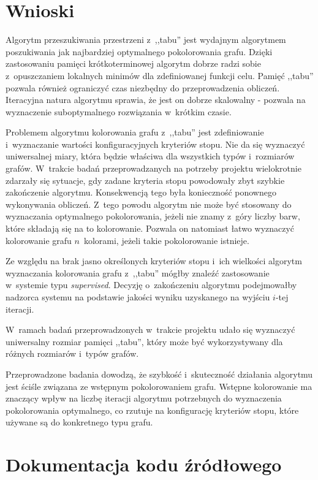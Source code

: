 \documentclass[a4paper,10pt]{article}
\begin{document}
\section*{Wnioski}

Algorytm przeszukiwania przestrzeni z~,,tabu'' jest wydajnym algorytmem poszukiwania jak najbardziej optymalnego pokolorowania grafu. Dzięki zastosowaniu pamięci krótkoterminowej algorytm dobrze radzi sobie z~opuszczaniem lokalnych minimów dla zdefiniowanej funkcji celu. Pamięć ,,tabu'' pozwala również ograniczyć czas niezbędny do przeprowadzenia obliczeń. Iteracyjna natura algorytmu sprawia, że jest on dobrze skalowalny - pozwala na wyznaczenie suboptymalnego rozwiązania w~krótkim czasie.

Problemem algorytmu kolorowania grafu z~,,tabu'' jest zdefiniowanie i~wyznaczanie wartości konfiguracyjnych kryteriów stopu. Nie da się wyznaczyć uniwersalnej miary, która będzie właściwa dla wszystkich typów i~rozmiarów grafów. W~trakcie badań przeprowadzanych na potrzeby projektu wielokrotnie zdarzały się sytuacje, gdy zadane kryteria stopu powodowały zbyt szybkie zakończenie algorytmu. Konsekwencją tego była konieczność ponownego wykonywania obliczeń. Z~tego powodu algorytm nie może być stosowany do wyznaczania optymalnego pokolorowania, jeżeli nie znamy z~góry liczby barw, które składają się na to kolorowanie. Pozwala on natomiast łatwo wyznaczyć kolorowanie grafu $n$~kolorami, jeżeli takie pokolorowanie istnieje.

Ze względu na brak jasno określonych kryteriów stopu i~ich wielkości algorytm wyznaczania kolorowania grafu z~,,tabu'' mógłby znaleźć zastosowanie w~systemie typu \emph{supervised}. Decyzję o~zakończeniu algorytmu podejmowałby nadzorca systemu na podstawie jakości wyniku uzyskanego na wyjściu $i$-tej iteracji.

W~ramach badań przeprowadzonych w~trakcie projektu udało się wyznaczyć uniwersalny rozmiar pamięci ,,tabu'', który może być wykorzystywany dla różnych rozmiarów i~typów grafów.

Przeprowadzone badania dowodzą, że szybkość i~skuteczność działania algorytmu jest ściśle związana ze wstępnym pokolorowaniem grafu. Wstępne kolorowanie ma znaczący wpływ na liczbę iteracji algorytmu potrzebnych do wyznaczenia pokolorowania optymalnego, co rzutuje na konfigurację kryteriów stopu, które używane są do konkretnego typu grafu.

\section*{Dokumentacja kodu źródłowego}
\end{document}
